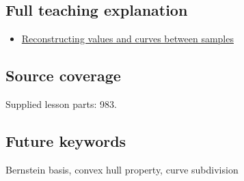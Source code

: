\subsection{Full teaching explanation}\label{full-teaching-explanation}

\begin{itemize}
\tightlist
\item
  \href{Continuous\%20Notes/Computing\%20Foundations\%20-\%20From\%20Bits\%20to\%20C++\%20and\%20Systems\%20APIs\#Reconstructing\%20values\%20and\%20curves\%20between\%20samples}{Reconstructing values and curves between samples}
\end{itemize}

\subsection{Source coverage}\label{source-coverage}

Supplied lesson parts: 983.

\subsection{Future keywords}\label{future-keywords}

Bernstein basis, convex hull property, curve subdivision
